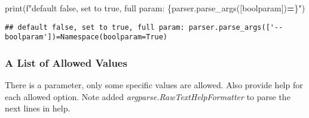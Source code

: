 \documentclass[
]{book}
\newenvironment{Shaded}{\begin{snugshade}}{\end{snugshade}}
\newcommand{\BuiltInTok}[1]{#1}
\newcommand{\NormalTok}[1]{#1}
\newcommand{\OperatorTok}[1]{\textcolor[rgb]{0.81,0.36,0.00}{\textbf{#1}}}
\newcommand{\SpecialCharTok}[1]{\textcolor[rgb]{0.00,0.00,0.00}{#1}}
\newcommand{\SpecialStringTok}[1]{\textcolor[rgb]{0.31,0.60,0.02}{#1}}
\newcommand{\StringTok}[1]{\textcolor[rgb]{0.31,0.60,0.02}{#1}}
\begin{document}
\begin{Shaded}
\begin{Highlighting}[]
\BuiltInTok{print}\NormalTok{(}\SpecialStringTok{f"default false, set to true, full param: }\SpecialCharTok{\{}\NormalTok{parser}\SpecialCharTok{.}\NormalTok{parse\_args([}\StringTok{\textquotesingle{}{-}{-}boolparam\textquotesingle{}}\NormalTok{])}\OperatorTok{=}\SpecialCharTok{\}}\SpecialStringTok{"}\NormalTok{)}
\end{Highlighting}
\end{Shaded}

\begin{verbatim}
## default false, set to true, full param: parser.parse_args(['--boolparam'])=Namespace(boolparam=True)
\end{verbatim}

\hypertarget{a-list-of-allowed-values}{%
\subsubsection{A List of Allowed Values}\label{a-list-of-allowed-values}}

There is a parameter, only some specific values are allowed. Also provide help for each allowed option. Note added \emph{argparse.RawTextHelpFormatter} to parse the next lines in help.
\end{document}

